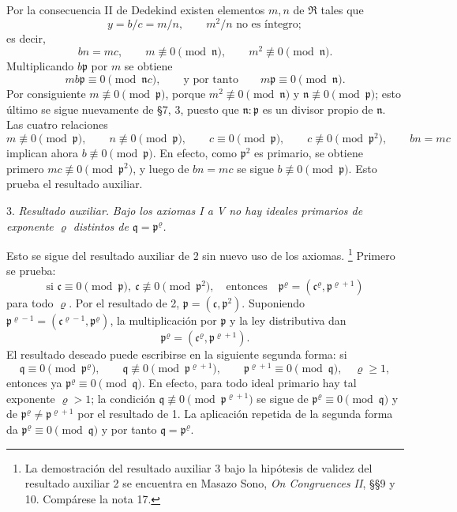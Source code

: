 \documentclass[11pt]{article}
\providecommand{\mR}{\mathfrak{R}}
\providecommand{\mc}{\mathfrak{c}}
\providecommand{\mn}{\mathfrak{n}}
\providecommand{\mpideal}{\mathfrak{p}}
\providecommand{\mq}{\mathfrak{q}}
\begin{document}
Por la consecuencia II de Dedekind existen elementos $m,n$ de $\mR$ tales que
\[
        y=b/c=m/n,
        \qquad m^2/n \text{ no es íntegro};
\]
es decir,
\[
        bn=mc,
        \qquad m\not\equiv0\pmod{\mn},
        \qquad m^2\not\equiv0\pmod{\mn}.
\]
Multiplicando $b\mpideal$ por $m$ se obtiene
\[
        mb\mpideal\equiv0\pmod{\mn c},
        \qquad\text{y por tanto}\qquad m\mpideal\equiv0\pmod{\mn}.
\]
Por consiguiente $m\not\equiv0\pmod{\mpideal}$, porque $m^2\not\equiv0\pmod{\mn}$ y $\mn\not\equiv0\pmod{\mpideal}$; esto último se sigue nuevamente de §7, 3, puesto que $\mn:\mpideal$ es un divisor propio de $\mn$. Las cuatro relaciones
\[
        m\not\equiv0\pmod{\mpideal},\qquad
        n\not\equiv0\pmod{\mpideal},\qquad
        c\equiv0\pmod{\mpideal},\qquad
        c\not\equiv0\pmod{\mpideal^2},\qquad
        bn=mc
\]
implican ahora $b\not\equiv0\pmod{\mpideal}$. En efecto, como $\mpideal^2$ es primario, se obtiene primero $mc\not\equiv0\pmod{\mpideal^2}$, y luego de $bn=mc$ se sigue $b\not\equiv0\pmod{\mpideal}$. Esto prueba el resultado auxiliar.

3. \emph{Resultado auxiliar.} \emph{Bajo los axiomas I a V no hay ideales primarios de exponente $\varrho$ distintos de $\mq=\mpideal^\varrho$.}

Esto se sigue del resultado auxiliar de 2 sin nuevo uso de los axiomas.
\footnote{La demostración del resultado auxiliar 3 bajo la hipótesis de validez del resultado auxiliar 2 se encuentra en Masazo Sono, \emph{On Congruences II}, §§9 y 10. Compárese la nota 17.}
Primero se prueba:
\[
        \text{si }\mc\equiv0\pmod{\mpideal},\ \mc\not\equiv0\pmod{\mpideal^2},
        \quad\text{entonces}\quad
        \mpideal^\varrho=(\mc^\varrho,\mpideal^{\varrho+1})
\]
para todo $\varrho$. Por el resultado de 2, $\mpideal=(\mc,\mpideal^2)$. Suponiendo $\mpideal^{\varrho-1}=(\mc^{\varrho-1},\mpideal^\varrho)$, la multiplicación por $\mpideal$ y la ley distributiva dan
\[
        \mpideal^\varrho=(\mc^\varrho,\mpideal^{\varrho+1}).
\]
El resultado deseado puede escribirse en la siguiente segunda forma: si
\[
        \mq\equiv0\pmod{\mpideal^\varrho},
        \qquad \mq\not\equiv0\pmod{\mpideal^{\varrho+1}},
        \qquad \mpideal^{\varrho+1}\equiv0\pmod{\mq},
        \quad \varrho\ge1,
\]
entonces ya $\mpideal^\varrho\equiv0\pmod{\mq}$. En efecto, para todo ideal primario hay tal exponente $\varrho>1$; la condición $\mq\not\equiv0\pmod{\mpideal^{\varrho+1}}$ se sigue de $\mpideal^\varrho\equiv0\pmod{\mq}$ y de $\mpideal^\varrho\ne\mpideal^{\varrho+1}$ por el resultado de 1. La aplicación repetida de la segunda forma da $\mpideal^\varrho\equiv0\pmod{\mq}$ y por tanto $\mq=\mpideal^\varrho$.
\end{document}
